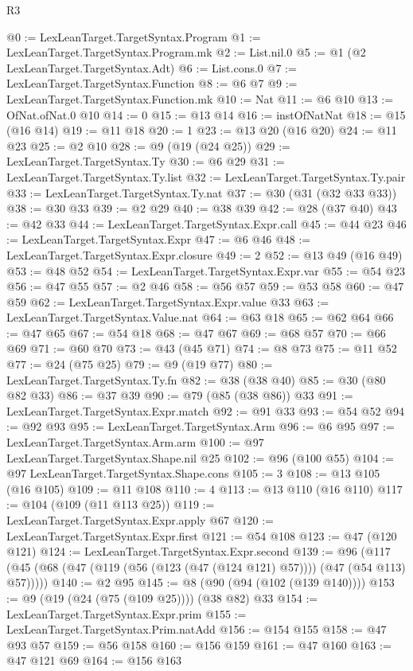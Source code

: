 \begin{lexlean}{R3}
\begin{coremodule}
@0 := LexLeanTarget.TargetSyntax.Program
@1 := LexLeanTarget.TargetSyntax.Program.mk
@2 := List.nil.{0}
@5 := @1 (@2 LexLeanTarget.TargetSyntax.Adt)
@6 := List.cons.{0}
@7 := LexLeanTarget.TargetSyntax.Function
@8 := @6 @7
@9 := LexLeanTarget.TargetSyntax.Function.mk
@10 := Nat
@11 := @6 @10
@13 := OfNat.ofNat.{0} @10
@14 := 0
@15 := @13 @14
@16 := instOfNatNat
@18 := @15 (@16 @14)
@19 := @11 @18
@20 := 1
@23 := @13 @20 (@16 @20)
@24 := @11 @23
@25 := @2 @10
@28 := @9 (@19 (@24 @25))
@29 := LexLeanTarget.TargetSyntax.Ty
@30 := @6 @29
@31 := LexLeanTarget.TargetSyntax.Ty.list
@32 := LexLeanTarget.TargetSyntax.Ty.pair
@33 := LexLeanTarget.TargetSyntax.Ty.nat
@37 := @30 (@31 (@32 @33 @33))
@38 := @30 @33
@39 := @2 @29
@40 := @38 @39
@42 := @28 (@37 @40)
@43 := @42 @33
@44 := LexLeanTarget.TargetSyntax.Expr.call
@45 := @44 @23
@46 := LexLeanTarget.TargetSyntax.Expr
@47 := @6 @46
@48 := LexLeanTarget.TargetSyntax.Expr.closure
@49 := 2
@52 := @13 @49 (@16 @49)
@53 := @48 @52
@54 := LexLeanTarget.TargetSyntax.Expr.var
@55 := @54 @23
@56 := @47 @55
@57 := @2 @46
@58 := @56 @57
@59 := @53 @58
@60 := @47 @59
@62 := LexLeanTarget.TargetSyntax.Expr.value @33
@63 := LexLeanTarget.TargetSyntax.Value.nat
@64 := @63 @18
@65 := @62 @64
@66 := @47 @65
@67 := @54 @18
@68 := @47 @67
@69 := @68 @57
@70 := @66 @69
@71 := @60 @70
@73 := @43 (@45 @71)
@74 := @8 @73
@75 := @11 @52
@77 := @24 (@75 @25)
@79 := @9 (@19 @77)
@80 := LexLeanTarget.TargetSyntax.Ty.fn
@82 := @38 (@38 @40)
@85 := @30 (@80 @82 @33)
@86 := @37 @39
@90 := @79 (@85 (@38 @86)) @33
@91 := LexLeanTarget.TargetSyntax.Expr.match
@92 := @91 @33
@93 := @54 @52
@94 := @92 @93
@95 := LexLeanTarget.TargetSyntax.Arm
@96 := @6 @95
@97 := LexLeanTarget.TargetSyntax.Arm.arm
@100 := @97 LexLeanTarget.TargetSyntax.Shape.nil @25
@102 := @96 (@100 @55)
@104 := @97 LexLeanTarget.TargetSyntax.Shape.cons
@105 := 3
@108 := @13 @105 (@16 @105)
@109 := @11 @108
@110 := 4
@113 := @13 @110 (@16 @110)
@117 := @104 (@109 (@11 @113 @25))
@119 := LexLeanTarget.TargetSyntax.Expr.apply @67
@120 := LexLeanTarget.TargetSyntax.Expr.first
@121 := @54 @108
@123 := @47 (@120 @121)
@124 := LexLeanTarget.TargetSyntax.Expr.second
@139 := @96 (@117 (@45 (@68 (@47 (@119 (@56 (@123 (@47 (@124 @121) @57)))) (@47 (@54 @113) @57)))))
@140 := @2 @95
@145 := @8 (@90 (@94 (@102 (@139 @140))))
@153 := @9 (@19 (@24 (@75 (@109 @25)))) (@38 @82) @33
@154 := LexLeanTarget.TargetSyntax.Expr.prim
@155 := LexLeanTarget.TargetSyntax.Prim.natAdd
@156 := @154 @155
@158 := @47 @93 @57
@159 := @56 @158
@160 := @156 @159
@161 := @47 @160
@163 := @47 @121 @69
@164 := @156 @163

\end{coremodule}
\end{lexlean}
